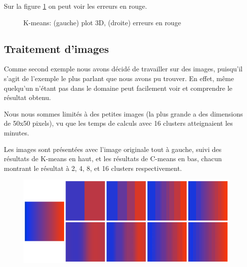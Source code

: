 \documentclass{article}
\begin{document}
  Sur la figure \ref{fig:kmeans-iris} on peut voir les erreurs en rouge.

  \begin{figure}[h]
    \centering
    \qquad
    \caption{K-means: (gauche) plot 3D, (droite) erreurs en rouge}%
    \label{fig:kmeans-iris}
  \end{figure}

  \subsection{Traitement d'images}

  Comme second exemple nous avons décidé de travailler sur des images, puisqu'il s'agit de l'exemple le plus parlant que nous avons pu trouver. En effet, même quelqu'un n'étant pas dans le domaine peut facilement voir et comprendre le résultat obtenu.

  Nous nous sommes limités à des petites images (la plus grande a des dimensions de 50x50 pixels), vu que les temps de calculs avec 16 clusters atteignaient les minutes.

  Les images sont présentées avec l'image originale tout à gauche, suivi des résultats de K-means en haut, et les résultats de C-means en bas, chacun montrant le résultat à 2, 4, 8, et 16 clusters respectivement.

  \begin{figure}[h]
    \centering
    \includegraphics[width=\textwidth]{images/concat_testing_mini.png}
  \end{figure}
\end{document}
